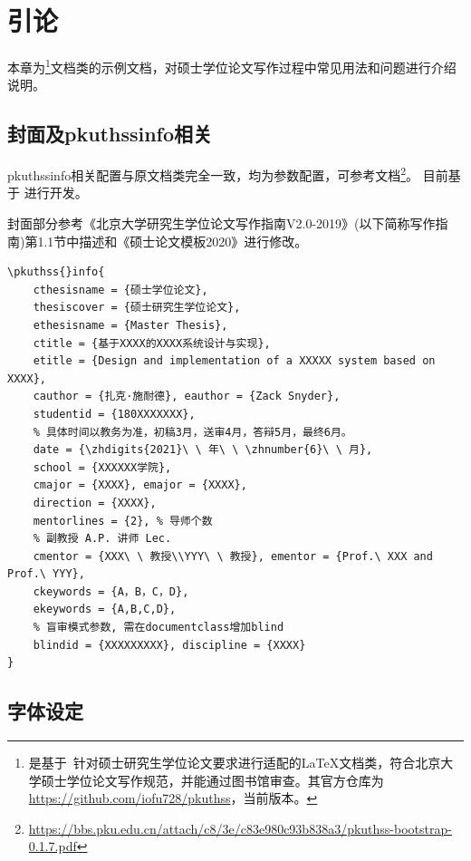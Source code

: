 
\chapter{引论}
\label{chap:introduction}

本章为\iofupkuthss{}\footnote{\iofupkuthss{} 是基于\pkuthss{}~\cite{casper2011pkuthss}针对硕士研究生学位论文要求进行适配的\LaTeX{}文档类，符合北京大学硕士学位论文写作规范，并能通过图书馆审查。其官方仓库为\url{https://github.com/iofu728/pkuthss}，当前版本\iofuversion。}文档类的示例文档，对硕士学位论文写作过程中常见用法和问题进行介绍说明。

\section{封面及pkuthssinfo相关}
\label{sec:cover-pkuthssinfo}

pkuthssinfo相关配置与\pkuthss{}原文档类完全一致，均为参数配置，可参考\pkuthss{}文档\footnote{\url{https://bbs.pku.edu.cn/attach/c8/3e/c83e980c93b838a3/pkuthss-bootstrap-0.1.7.pdf}}。
目前\iofupkuthss{}基于\pkuthss{} \iofubaseversion{}进行开发。

封面部分参考《北京大学研究生学位论文写作指南V2.0-2019》(以下简称写作指南)第1.1节中描述和《硕士论文模板2020》进行修改。

\begin{Verbatim}
\pkuthss{}info{
	cthesisname = {硕士学位论文},
 	thesiscover = {硕士研究生学位论文},
	ethesisname = {Master Thesis},
	ctitle = {基于XXXX的XXXX系统设计与实现},
	etitle = {Design and implementation of a XXXXX system based on XXXX},
	cauthor = {扎克·施耐德}, eauthor = {Zack Snyder},
	studentid = {180XXXXXXX},
	% 具体时间以教务为准，初稿3月，送审4月，答辩5月，最终6月。
	date = {\zhdigits{2021}\ \ 年\ \ \zhnumber{6}\ \ 月},
	school = {XXXXXX学院},
	cmajor = {XXXX}, emajor = {XXXX},
	direction = {XXXX},
	mentorlines = {2}, % 导师个数
	% 副教授 A.P. 讲师 Lec.
	cmentor = {XXX\ \ 教授\\YYY\ \ 教授}, ementor = {Prof.\ XXX and Prof.\ YYY},
	ckeywords = {A，B，C，D},
	ekeywords = {A,B,C,D},
	% 盲审模式参数, 需在documentclass增加blind
	blindid = {XXXXXXXXX}, discipline = {XXXX}
}
\end{Verbatim}

\section{字体设定}
\label{sec:fontset}

